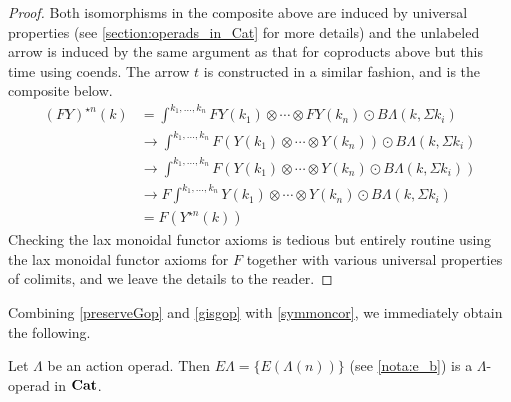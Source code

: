 \begin{proof}
Both isomorphisms in the composite above are induced by universal properties (see \cref{section:operads_in_Cat} for more details) and the unlabeled arrow is induced by the same argument as that for coproducts above but this time using coends. The arrow $t$ is constructed in a similar fashion, and is the composite below.
  \begin{align*}
    (FY)^{\star n}(k) & =  \int^{k_{1}, \ldots, k_{n}} FY(k_{1}) \otimes \cdots \otimes FY(k_{n}) \odot B\Lambda(k, \Sigma k_{i}) \\
    & \rightarrow   \int^{k_{1}, \ldots, k_{n}} F(Y(k_{1}) \otimes \cdots \otimes Y(k_{n})) \odot B\Lambda(k, \Sigma k_{i}) \\
    & \rightarrow  \int^{k_{1}, \ldots, k_{n}} F(Y(k_{1}) \otimes \cdots \otimes Y(k_{n}) \odot B\Lambda(k, \Sigma k_{i}) ) \\
    & \rightarrow  F\int^{k_{1}, \ldots, k_{n}} Y(k_{1}) \otimes \cdots \otimes Y(k_{n}) \odot B\Lambda(k, \Sigma k_{i})  \\
    & =  F(Y^{\star n}(k))
  \end{align*}
Checking the lax monoidal functor axioms is tedious but entirely routine using the lax monoidal functor axioms for $F$ together with various universal properties of colimits, and we leave the details to the reader.
\end{proof}

Combining \cref{preserveGop} and \cref{gisgop} with \cref{symmoncor}, we immediately obtain the following.

\begin{cor}\label{cor:elambda_lambdaop}
Let $\Lambda$ be an action operad. Then $E\Lambda = \{ E\left(\Lambda(n)\right) \}$ (see \cref{nota:e_b}) is a $\Lambda$-operad in $\mathbf{Cat}$.
\end{cor}

